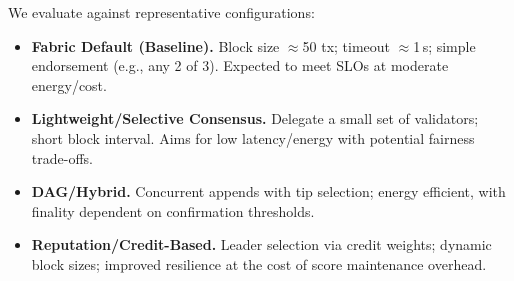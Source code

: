\documentclass[12pt,onecolumn]{IEEEtran} %
\begin{document}
We evaluate against representative configurations:
\begin{itemize}
    \item \textbf{Fabric Default (Baseline).} Block size $\approx$50 tx; timeout $\approx$1\,s; simple endorsement (e.g., any 2 of 3). Expected to meet SLOs at moderate energy/cost.
    \item \textbf{Lightweight/Selective Consensus.} Delegate a small set of validators; short block interval. Aims for low latency/energy with potential fairness trade-offs.
    \item \textbf{DAG/Hybrid.} Concurrent appends with tip selection; energy efficient, with finality dependent on confirmation thresholds.
    \item \textbf{Reputation/Credit-Based.} Leader selection via credit weights; dynamic block sizes; improved resilience at the cost of score maintenance overhead.\cite{morais2023surveyonintegration}
\end{itemize}
\end{document}
